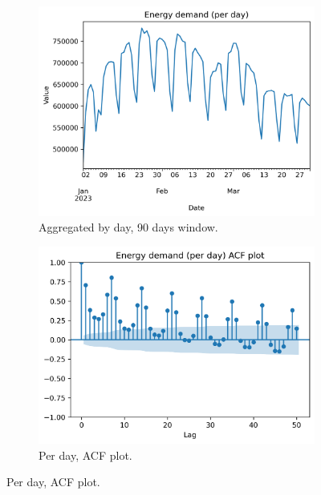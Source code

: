 \begin{figure}[H]\ContinuedFloat
    \begin{subfigure}{.44\textwidth}
        \centering
        \includegraphics[width=1\linewidth]{images/variable_analysis/esios_demand_d_90}
        \caption{Aggregated by day, 90 days window.}
         \label{fig:demand-series-day}
    \end{subfigure}
    \begin{subfigure}{.45\textwidth}
        \centering
        \includegraphics[width=1\linewidth]{images/variable_analysis/esios_demand_d_acf}
        \caption{Per day, ACF plot.}
        \label{fig:demand-series-day-acf}
    \end{subfigure}
\end{figure}

